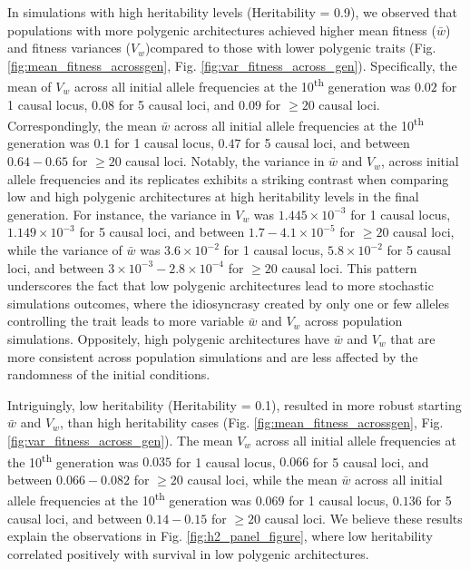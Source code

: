 \documentclass{article}
\begin{document}
In simulations with high heritability levels (Heritability = 0.9), we observed that populations with more polygenic architectures achieved higher mean fitness ($\bar{w}$) and fitness variances ($V_w$)compared to those with lower polygenic traits (Fig. \ref{fig:mean_fitness_acrossgen}, Fig. \ref{fig:var_fitness_across_gen}). Specifically, the mean of $V_w$ across all initial allele frequencies at the 10\textsuperscript{th} generation was $0.02$ for 1 causal locus, $0.08$ for 5 causal loci, and $0.09$ for $\geq 20$ causal loci. Correspondingly, the mean $\bar{w}$ across all initial allele frequencies at the 10\textsuperscript{th} generation was $0.1$ for 1 causal locus, $0.47$ for 5 causal loci, and between $0.64- 0.65$ for $\geq 20$ causal loci. Notably, the variance in $\bar{w}$ and $V_w$, across initial allele frequencies and its replicates exhibits a striking contrast when comparing low and high polygenic architectures at high heritability levels in the final generation. For instance, the variance in $V_w$ was $1.445 \times 10^{-3}$ for 1 causal locus, $1.149 \times 10^{-3}$ for 5 causal loci, and between $1.7-4.1 \times 10^{-5}$ for $\geq 20$ causal loci, while the variance of $\bar{w}$ was $3.6 \times 10^{-2}$ for 1 causal locus, $5.8 \times 10^{-2}$ for 5 causal loci, and between $3 \times 10^{-3} - 2.8 \times 10^{-4}$ for $\geq 20$ causal loci. This pattern underscores the fact that low polygenic architectures lead to more stochastic simulations outcomes, where the idiosyncrasy created by only one or few alleles controlling the trait leads to more variable $\bar{w}$ and $V_w$ across population simulations. Oppositely, high polygenic architectures have $\bar{w}$ and $V_w$ that are more consistent across population simulations and are less affected by the randomness of the initial conditions.

Intriguingly, low heritability (Heritability = 0.1), resulted in more robust starting $\bar{w}$ and $V_w$, than high heritability cases (Fig. \ref{fig:mean_fitness_acrossgen}, Fig. \ref{fig:var_fitness_across_gen}). The mean $V_w$ across all initial allele frequencies at the 10\textsuperscript{th} generation was $0.035$ for 1 causal locus, $0.066$ for 5 causal loci, and between $0.066-0.082$ for $\geq 20$ causal loci, while the mean $\bar{w}$ across all initial allele frequencies at the 10\textsuperscript{th} generation was $0.069$ for 1 causal locus, $0.136$ for 5 causal loci, and between $0.14-0.15$ for $\geq 20$ causal loci. We believe these results explain the observations in Fig. \ref{fig:h2_panel_figure}, where low heritability correlated positively with survival in low polygenic architectures. 
\end{document}
